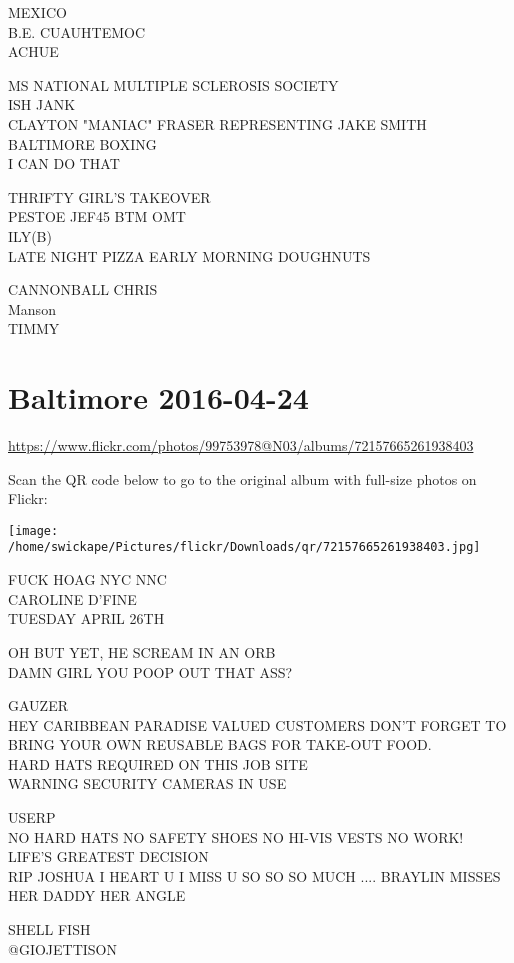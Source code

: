 \documentclass[10pt,letterpaper]{article}
\begin{document}
MEXICO\\
B.E. CUAUHTEMOC\\
ACHUE

MS NATIONAL MULTIPLE SCLEROSIS SOCIETY\\
ISH JANK\\
CLAYTON "MANIAC" FRASER REPRESENTING JAKE SMITH BALTIMORE BOXING\\
I CAN DO THAT

THRIFTY GIRL'S TAKEOVER\\
PESTOE JEF45 BTM OMT\\
ILY(B)\\
LATE NIGHT PIZZA EARLY MORNING DOUGHNUTS

CANNONBALL CHRIS\\
Manson\\
TIMMY
\pagebreak

\section*{Baltimore 2016-04-24}

\url{https://www.flickr.com/photos/99753978@N03/albums/72157665261938403}

Scan the QR code below to go to the original album with full-size photos on Flickr:

\texttt{[image: /home/swickape/Pictures/flickr/Downloads/qr/72157665261938403.jpg]}
\pagebreak

FUCK HOAG NYC NNC\\
CAROLINE D'FINE\\
TUESDAY APRIL 26TH

OH BUT YET, HE SCREAM IN AN ORB\\
DAMN GIRL YOU POOP OUT THAT ASS?

GAUZER\\
HEY CARIBBEAN PARADISE VALUED CUSTOMERS DON'T FORGET TO BRING YOUR OWN REUSABLE BAGS FOR TAKE{-}OUT FOOD.\\
HARD HATS REQUIRED ON THIS JOB SITE\\
WARNING SECURITY CAMERAS IN USE

USERP\\
NO HARD HATS NO SAFETY SHOES NO HI{-}VIS VESTS NO WORK!\\
LIFE'S GREATEST DECISION\\
RIP JOSHUA I HEART U I MISS U SO SO SO MUCH .... BRAYLIN MISSES HER DADDY HER ANGLE

SHELL FISH\\
@GIOJETTISON
\end{document}
